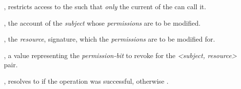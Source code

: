 \begin{code}
\begin{functions}
      \begin{modifiers}
        \item {}, restricts access to the
           such that \emph{only} the current  of the
           can call it.
      \end{modifiers}

      \begin{parameters}
        \item {}, the account  of the
          \emph{subject} whose \emph{permissions} are to be modified.

        \item {}, the \emph{resource}, 
          signature, which the \emph{permissions} are to be modified for.

        \item {}, a  value representing the
          \emph{permission-bit} to revoke for the \emph{<subject, resource>}
          pair.
      \end{parameters}

      \begin{returns}
      \item {}, resolves to  if the operation was
        successful, otherwise .
      \end{returns}
  \end{functions}
\end{code}
